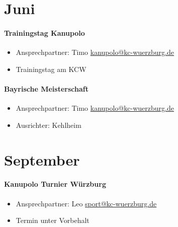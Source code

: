 \documentclass[12pt, a4paper]{report}
\begin{document}
\section*{Juni}\paragraph{Trainingstag Kanupolo}
\begin{itemize}
    \item Ansprechpartner: Timo \href{mailto:kanupolo@kc-wuerzburg.de}{kanupolo@kc-wuerzburg.de}
    \item Trainingstag am KCW
\end{itemize}

\paragraph{Bayrische Meisterschaft}
\begin{itemize}
    \item Ansprechpartner: Timo \href{mailto:kanupolo@kc-wuerzburg.de}{kanupolo@kc-wuerzburg.de}
    \item Ausrichter: Kehlheim
\end{itemize}

\section*{September}\paragraph{Kanupolo Turnier Würzburg}
\begin{itemize}
    \item Ansprechpartner: Leo \href{mailto:sport@kc-wuerzburg.de}{sport@kc-wuerzburg.de}
    \item Termin unter Vorbehalt
\end{itemize}
\end{document}
